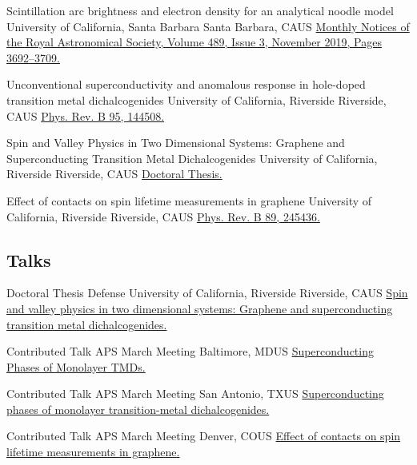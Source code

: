 \documentclass[10pt,letter]{moderncv}
\begin{document}
    {Scintillation arc brightness and electron density for an analytical noodle model}
    {University of California, Santa Barbara}
    {Santa Barbara, CA}{US}
    {\href{https://arxiv.org/abs/1908.00095}
      {Monthly Notices of the Royal Astronomical Society, Volume 489, Issue 3, November 2019, Pages 3692–3709.}}

    {Unconventional superconductivity and anomalous response in hole-doped transition metal dichalcogenides}
    {University of California, Riverside}
    {Riverside, CA}{US}
    {\href{https://journals.aps.org/prb/abstract/10.1103/PhysRevB.95.144508}
      {Phys. Rev. B 95, 144508.}}

    {Spin and Valley Physics in Two Dimensional Systems: Graphene and Superconducting Transition Metal Dichalcogenides}
    {University of California, Riverside}
    {Riverside, CA}{US}
    {\href{https://escholarship.org/uc/item/4941w4t0}
      {Doctoral Thesis.}}

    {Effect of contacts on spin lifetime measurements in graphene}
    {University of California, Riverside}
    {Riverside, CA}{US}
    {\href{https://journals.aps.org/prb/abstract/10.1103/PhysRevB.89.245436}
      {Phys. Rev. B 89, 245436.}}

  \subsection{Talks}

    {Doctoral Thesis Defense}
    {University of California, Riverside}
    {Riverside, CA}{US}
    {\href{https://evansosenko.com/deck-doctoral-thesis/}
      {Spin and valley physics in two dimensional systems: Graphene and superconducting transition metal dichalcogenides.}}

    {Contributed Talk}
    {APS March Meeting}
    {Baltimore, MD}{US}
    {\href{https://evansosenko.com/deck-tmdsc/}
      {Superconducting Phases of Monolayer TMDs.}}

    {Contributed Talk}
    {APS March Meeting}
    {San Antonio, TX}{US}
    {\href{https://evansosenko.com/deck-dichalcogenides-superconductivity/}
      {Superconducting phases of monolayer transition-metal dichalcogenides.}}

    {Contributed Talk}
    {APS March Meeting}
    {Denver, CO}{US}
    {\href{https://evansosenko.com/deck-spin-lifetime/}
      {Effect of contacts on spin lifetime measurements in graphene.}}
\end{document}
